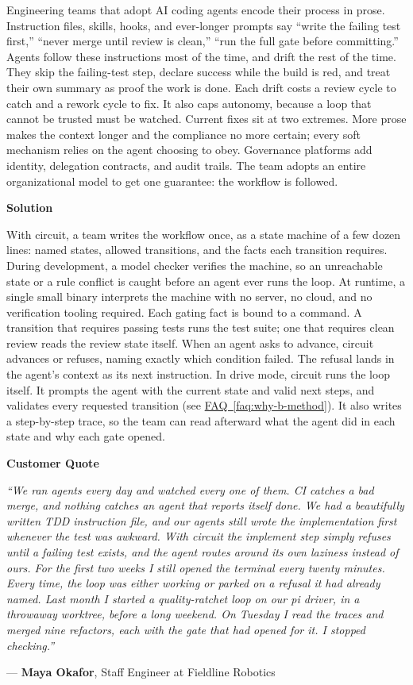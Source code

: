\documentclass[11pt,letterpaper]{article}
\newcommand{\prsection}[1]{%
  \vspace{1em}%
  {\large\bfseries\color{SectionBlue}#1}%
  \vspace{0.3em}\par%
}
\newcommand{\faqref}[1]{\hyperref[#1]{FAQ~\ref*{#1}}}
\begin{document}
Engineering teams that adopt AI coding agents encode their process in prose. Instruction files, skills, hooks, and ever-longer prompts say ``write the failing test first,'' ``never merge until review is clean,'' ``run the full gate before committing.'' Agents follow these instructions most of the time, and drift the rest of the time. They skip the failing-test step, declare success while the build is red, and treat their own summary as proof the work is done. Each drift costs a review cycle to catch and a rework cycle to fix. It also caps autonomy, because a loop that cannot be trusted must be watched. Current fixes sit at two extremes. More prose makes the context longer and the compliance no more certain; every soft mechanism relies on the agent choosing to obey. Governance platforms add identity, delegation contracts, and audit trails. The team adopts an entire organizational model to get one guarantee: the workflow is followed.

\prsection{Solution}

With circuit, a team writes the workflow once, as a state machine of a few dozen lines: named states, allowed transitions, and the facts each transition requires. During development, a model checker verifies the machine, so an unreachable state or a rule conflict is caught before an agent ever runs the loop. At runtime, a single small binary interprets the machine with no server, no cloud, and no verification tooling required. Each gating fact is bound to a command. A transition that requires passing tests runs the test suite; one that requires clean review reads the review state itself. When an agent asks to advance, circuit advances or refuses, naming exactly which condition failed. The refusal lands in the agent's context as its next instruction. In drive mode, circuit runs the loop itself. It prompts the agent with the current state and valid next steps, and validates every requested transition (see \faqref{faq:why-b-method}). It also writes a step-by-step trace, so the team can read afterward what the agent did in each state and why each gate opened.

\prsection{Customer Quote}

\begin{customerquote}
\textit{``We ran agents every day and watched every one of them. CI catches a bad merge, and nothing catches an agent that reports itself done. We had a beautifully written TDD instruction file, and our agents still wrote the implementation first whenever the test was awkward. With circuit the implement step simply refuses until a failing test exists, and the agent routes around its own laziness instead of ours. For the first two weeks I still opened the terminal every twenty minutes. Every time, the loop was either working or parked on a refusal it had already named. Last month I started a quality-ratchet loop on our pi driver, in a throwaway worktree, before a long weekend. On Tuesday I read the traces and merged nine refactors, each with the gate that had opened for it. I stopped checking.''}

\raggedleft --- \textbf{Maya Okafor}, Staff Engineer at Fieldline Robotics
\end{customerquote}
\end{document}
